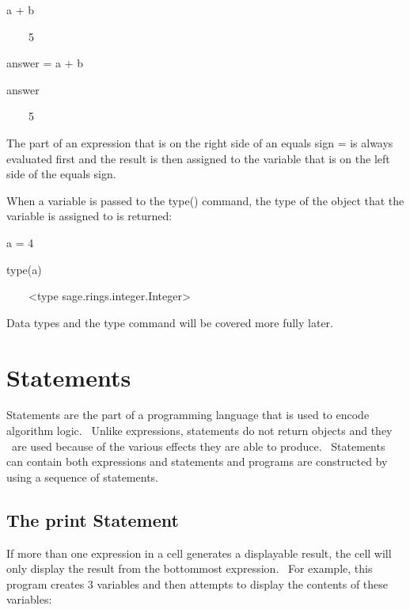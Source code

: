 \documentclass[12pt,twoside]{book}
\begin{document}
\bigskip

a + b

{\textbar}

\ \ \ \ 5


\bigskip

answer = a + b

{\textbar}


\bigskip

answer

{\textbar}

\ \ \ \ 5


\bigskip

The part of an expression that is on the right side of an equals sign {\textquotesingle}={\textquotesingle} is always evaluated first and the result is then assigned to the variable that is on the left side of the equals sign. 

\bigskip

When a variable is passed to the type() command, the type of the object that the variable is assigned to is returned: 

\bigskip

a = 4

type(a)

{\textbar}

\ \ \ \ {\textless}type
{\textquotesingle}sage.rings.integer.Integer{\textquotesingle}{\textgreater}


\bigskip

Data types and the type command will be covered more fully later.

\section[Statements]{Statements}

Statements are the part of a programming language that is used to encode algorithm logic. \ Unlike expressions, statements do not return objects and they \ are used because of the various effects they are able to produce. \ Statements can contain both expressions and statements and programs are constructed by using a sequence of statements.

\subsection[The print Statement]{The print Statement}

If more than one expression in a cell generates a displayable result, the cell will only display the result from the bottommost expression. \ For example, this program creates 3 variables and then attempts to display the contents of these variables: 
\end{document}
